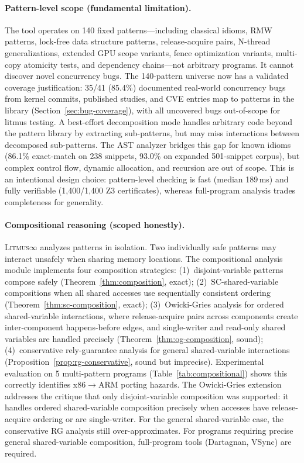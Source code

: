 \documentclass[11pt]{article}
\newcommand{\litmus}{\textsc{Litmus$\infty$}}
\begin{document}
\paragraph{Pattern-level scope (fundamental limitation).}
The tool operates on 140 fixed patterns---including classical idioms,
RMW patterns, lock-free data structure patterns, release-acquire pairs,
N-thread generalizations, extended GPU scope variants, fence optimization
variants, multi-copy atomicity tests, and dependency chains---not
arbitrary programs.
It cannot discover novel concurrency bugs. The 140-pattern universe
now has a validated coverage justification: 35/41 (85.4\%)
documented real-world concurrency bugs from kernel commits,
published studies, and CVE entries map to patterns in the library
(Section~\ref{sec:bug-coverage}), with all uncovered bugs
out-of-scope for litmus testing.
A best-effort decomposition mode handles arbitrary code beyond the
pattern library by extracting sub-patterns, but may miss interactions
between decomposed sub-patterns.
The AST analyzer bridges
this gap for known idioms (86.1\% exact-match on 238 snippets,
93.0\% on expanded 501-snippet corpus), but
complex control flow, dynamic allocation, and recursion are out of
scope. This is an intentional design choice: pattern-level checking
is fast (median 189\,ms) and fully verifiable (1{,}400/1{,}400 Z3 certificates),
whereas full-program analysis trades completeness for generality.

\paragraph{Compositional reasoning (scoped honestly).}
\litmus{} analyzes patterns in isolation. Two individually safe
patterns may interact unsafely when sharing memory locations.
The compositional analysis module implements four composition strategies:
(1)~disjoint-variable patterns compose safely
(Theorem~\ref{thm:composition}, exact);
(2)~SC-shared-variable compositions when all shared accesses use
sequentially consistent ordering (Theorem~\ref{thm:sc-composition}, exact);
(3)~Owicki-Gries analysis for ordered shared-variable interactions,
where release-acquire pairs across components create inter-component
happens-before edges, and single-writer and read-only shared variables
are handled precisely (Theorem~\ref{thm:og-composition}, sound);
(4)~conservative rely-guarantee analysis for general shared-variable
interactions (Proposition~\ref{prop:rg-conservative}, sound but imprecise).
Experimental evaluation on 5 multi-pattern programs
(Table~\ref{tab:compositional}) shows
this correctly identifies x86$\to$ARM porting hazards.
The Owicki-Gries extension addresses the critique that only disjoint-variable
composition was supported: it handles ordered shared-variable composition
precisely when accesses have release-acquire ordering or are single-writer.
For the general shared-variable case, the conservative RG analysis
still over-approximates.
For programs requiring precise general shared-variable composition,
full-program tools (Dartagnan, VSync) are required.
\end{document}
